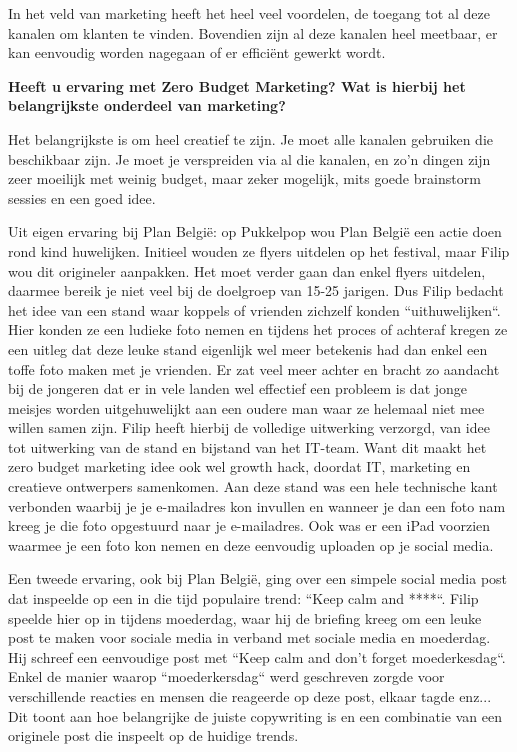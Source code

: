 In het veld van marketing heeft het heel veel voordelen, de toegang tot al deze kanalen om klanten te vinden. Bovendien zijn al deze kanalen heel meetbaar, er kan eenvoudig worden nagegaan of er efficiënt gewerkt wordt.
		
\textbf{Heeft u ervaring met Zero Budget Marketing? Wat is hierbij het belangrijkste onderdeel van marketing?}
	
	Het belangrijkste is om heel creatief te zijn. Je moet alle kanalen gebruiken die beschikbaar zijn. Je moet je verspreiden via al die kanalen, en zo'n dingen zijn zeer moeilijk met weinig budget, maar zeker mogelijk, mits goede brainstorm sessies en een goed idee. 
	
	Uit eigen ervaring bij Plan België: op Pukkelpop wou Plan België een actie doen rond kind huwelijken. Initieel wouden ze flyers uitdelen op het festival, maar Filip wou dit origineler aanpakken. Het moet verder gaan dan enkel flyers uitdelen, daarmee bereik je niet veel bij de doelgroep van 15-25 jarigen. Dus Filip bedacht het idee van een stand waar koppels of vrienden zichzelf konden ``uithuwelijken``. Hier konden ze een ludieke foto nemen en tijdens het proces of achteraf kregen ze een uitleg dat deze leuke stand eigenlijk wel meer betekenis had dan enkel een toffe foto maken met je vrienden. Er zat veel meer achter en bracht zo aandacht bij de jongeren dat er in vele landen wel effectief een probleem is dat jonge meisjes worden uitgehuwelijkt aan een oudere man waar ze helemaal niet mee willen samen zijn. Filip heeft hierbij de volledige uitwerking verzorgd, van idee tot uitwerking van de stand en bijstand van het IT-team. Want dit maakt het zero budget marketing idee ook wel growth hack, doordat IT, marketing en creatieve ontwerpers samenkomen. Aan deze stand was een hele technische kant verbonden waarbij je je e-mailadres kon invullen en wanneer je dan een foto nam kreeg je die foto opgestuurd naar je e-mailadres. Ook was er een iPad voorzien waarmee je een foto kon nemen en deze eenvoudig uploaden op je social media.
	
	Een tweede ervaring, ook bij Plan België, ging over een simpele social media post dat inspeelde op een in die tijd populaire trend: ``Keep calm and ****``. Filip speelde hier op in tijdens moederdag, waar hij de briefing kreeg om een leuke post te maken voor sociale media in verband met sociale media en moederdag. Hij schreef een eenvoudige post met ``Keep calm and don't forget moederkesdag``. Enkel de manier waarop ``moederkersdag`` werd geschreven zorgde voor verschillende reacties en mensen die reageerde op deze post, elkaar tagde enz... Dit toont aan hoe belangrijke de juiste copywriting is en een combinatie van een originele post die inspeelt op de huidige trends.
	
